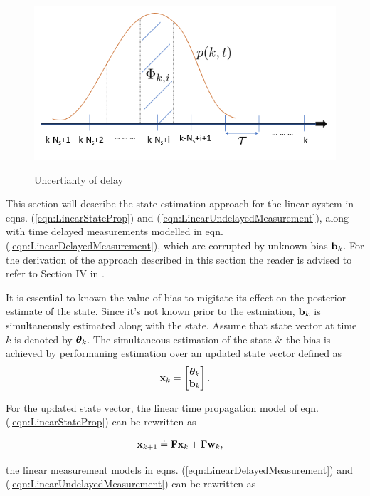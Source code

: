 \begin{figure}
	{\includegraphics[width=1.0\columnwidth]{./img/delay_uncertainty.png}}
	\caption{Uncertianty of delay}
	\label{fig:delay_uncertainty}
\end{figure}

This section will describe the state estimation approach for the linear system in eqns. (\ref{eqn:LinearStateProp}) and (\ref{eqn:LinearUndelayedMeasurement}), along with time delayed measurements modelled in eqn. (\ref{eqn:LinearDelayedMeasurement}), which are corrupted by unknown bias $\mathbf{b}_k$. 
For the derivation of the approach described in this section the reader is advised to refer to Section IV in \cite{choi2012state}.

It is essential to known the value of bias to migitate its effect on the posterior estimate of the state. Since it's not known prior to the estmiation, $\mathbf{b}_k$ is simultaneously estimated along with the state. 
Assume that state vector at time $k$ is denoted by $\boldsymbol{\theta}_k$.
The simultaneous estimation of the state \& the bias is achieved by performaning estimation over an updated state vector defined as 
\begin{equation}
	\mathbf{x}_k =
	\begin{bmatrix}
		\boldsymbol{\theta}_k \\ \mathbf{b}_k
	\end{bmatrix}. 
\end{equation}

For the updated state vector, the linear time propagation model of eqn. (\ref{eqn:LinearStateProp}) can be rewritten as

\begin{align}
	\label{eqn:LinearStateProp4UpdatedState}
	\mathbf{x}_{k+1} &\doteq \mathbf{F} \mathbf{x}_k + \boldsymbol{\Gamma} \mathbf{w}_k,
\end{align}

the linear measurement models in eqns. (\ref{eqn:LinearDelayedMeasurement}) and (\ref{eqn:LinearUndelayedMeasurement}) can be rewritten as

